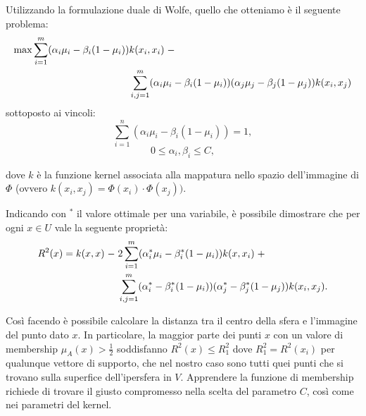 \documentclass[a4paper,12pt]{report}
\begin{document}
Utilizzando la formulazione duale di Wolfe, quello che otteniamo è il seguente problema:
\begin{equation}
\begin{split}
    \max \displaystyle\sum_{i=1}^{m}(\alpha_i\mu_i - \beta_i(1-\mu_i))&k(x_i,x_i)\hspace{0,1cm}- \\ &\displaystyle\sum_{i,j=1}^{m}(\alpha_i\mu_i - \beta_i(1-\mu_i))(\alpha_j\mu_j - \beta_j(1-\mu_j))k(x_i,x_j)
\end{split}
\label{eq:problema_finale}
\end{equation}
sottoposto ai vincoli:
\begin{equation}
    \displaystyle\sum_{i=1}^{n}(\alpha_i\mu_i - \beta_i(1-\mu_i)) = 1,
    \label{eq:v1_problema_finale}
\end{equation}
\begin{equation}
    0 \le \alpha_i,\beta_i \le C,
    \label{eq:v2_problema_finale}
\end{equation}

\noindent dove $k$ è la funzione kernel associata alla mappatura nello spazio dell'immagine di $\Phi$ (ovvero $k(x_i,x_j) = \Phi(x_i)\cdot\Phi(x_j))$.

Indicando con $^*$ il valore ottimale per una variabile, è possibile dimostrare che per ogni $x \in U$ vale la seguente proprietà:
\begin{equation*}
\begin{split}
    R^{2}(x) = k(x,x) \hspace{0,1cm}- \hspace{0,1cm}&2\displaystyle\sum_{i=1}^{m}(\alpha_{i}^{*}\mu_{i} - \beta_{i}^{*}(1-\mu_{i}))k(x,x_i)\hspace{0,1cm} + \\ 
    &\displaystyle\sum_{i,j=1}^{m}(\alpha_{i}^{*} - \beta_{i}^{*}(1-\mu_{i}))(\alpha_{j}^{*} - \beta_{j}^{*}(1-\mu_{j}))k(x_i,x_j).
\end{split}
\end{equation*}

\noindent Così facendo è possibile calcolare la distanza tra il centro della sfera e l'immagine del punto dato $x$.
In particolare, la maggior parte dei punti $x$ con un valore di membership $\mu_{A}(x) > \frac{1}{2}$ soddisfanno $R^2(x) \le R^2_1$ dove $R^2_1 = R^2(x_i)$ per qualunque vettore di supporto, che nel nostro caso sono tutti quei punti che si trovano sulla superfice dell'ipersfera in $V$.
Apprendere la funzione di membership richiede di trovare il giusto compromesso nella scelta del parametro $C$, così come nei parametri del kernel.
\end{document}
